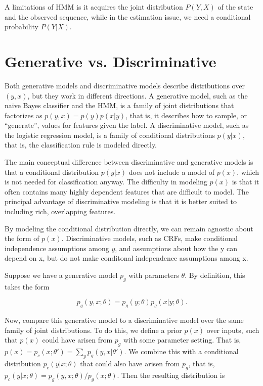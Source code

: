 \documentclass{article}
\begin{document}
A limitations of HMM is it acquires the joint distribution $P(Y, X)$ of the state and the observed sequence, while in the estimation issue, we need a conditional probability $P(Y|X)$.

\section{Generative vs. Discriminative}
Both generative models and discriminative models describe distributions over $(y,x)$, but they work in different directions. A generative model, such as the naive Bayes classifier and the HMM, is a family of joint distributions that factorizes as $p(y,x) = p(y)p(x|y)$, that is, it describes how to sample, or ``generate'', values for features given the label. A discriminative model, such as the logistic regression model, is a family of conditional distributions $p(y|x)$, that is, the classification rule is modeled directly. 


The main conceptual difference between discriminative and generative models is that a conditional distribution $p(y|x)$ does not include a model of $p(x)$, which is not needed for classification anyway. The difficulty in modeling $p(x)$ is that it often contains many highly dependent features that are difficult to model. The principal advantage of discriminative modeling is that it is better suited to including rich, overlapping features. 

By modeling the conditional distribution directly, we can remain agnostic about the form of $p(x)$. Discriminative models, such as CRFs, make conditional independence assumptions among $y$, and assumptions about how the y can depend on x, but do not make conditonal independence assumptions among x.


Suppose we have a generative model $p_g$ with parameters $\theta$. By definition, this takes
the form

\[p_g(y, x; \theta) = p_g(y; \theta)p_g(x|y; \theta). \]

Now, compare this generative model to a discriminative model over
the same family of joint distributions. To do this, we define a prior
$p(x)$ over inputs, such that $p(x)$ could have arisen from $p_g$ with some
parameter setting. That is, $p(x) = p_c(x; \theta') = \sum_y p_g(y, x|\theta')$. 
We combine this with a conditional distribution $p_c(y|x; \theta)$ that could also have
arisen from $p_g$, that is, $p_c(y|x; \theta) = p_g(y, x; \theta)/p_g(x; \theta)$. Then the resulting distribution is
\end{document}
